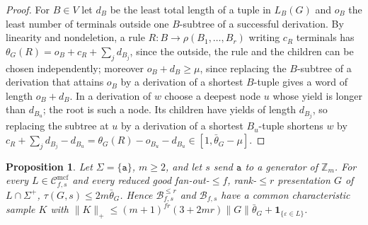 \documentclass[11pt]{article}
\numberwithin{equation}{section}
\theoremstyle{plain}
\newtheorem{proposition}[theorem]{Proposition}
\theoremstyle{definition}
\theoremstyle{remark}
\newcommand{\Cmcf}[2]{\mathcal{C}^{\mathrm{mcf}}_{#1,#2}}
\newcommand{\eps}{\varepsilon}
\begin{document}
\begin{proof}
For $B\in V$ let $d_B$ be the least total length of a tuple in $L_B(G)$ and $o_B$
the least number of terminals outside one $B$-subtree of a successful
derivation.  By linearity and nondeletion, a rule $R:B\to\rho(B_1,\ldots,B_r)$
writing $c_R$ terminals has $\theta_G(R)=o_B+c_R+\sum_jd_{B_j}$, since the outside,
the rule and the children can be chosen independently; moreover
$o_B+d_B\ge\mu$, since replacing the $B$-subtree of a derivation that attains $o_B$
by a derivation of a shortest $B$-tuple gives a word of length $o_B+d_B$.  In a derivation of $w$ choose a deepest node $u$ whose yield is
longer than $d_{B_u}$; the root is such a node.  Its children have yields of
length $d_{B_j}$, so replacing the subtree at $u$ by a derivation of a shortest
$B_u$-tuple shortens $w$ by
$c_R+\sum_jd_{B_j}-d_{B_u}=\theta_G(R)-o_{B_u}-d_{B_u}\in[1,\bar\theta_G-\mu]$.
\end{proof}

\begin{proposition}\label{prop:unary-cyclic-linear}
Let $\Sigma=\{\mathtt a\}$, $m\ge2$, and let $s$ send $\mathtt a$ to a generator of
$\mathbb Z_m$.  For every $L\in\Cmcf{f}{s}$ and every reduced good
fan-out-$\le f$, rank-$\le r$ presentation $G$ of $L\cap\Sigma^+$,
$\tau(G,s)\le2m\bar\theta_G$.  Hence $\mathcal B^{\le r}_{f,s}$ and
$\mathcal B_{f,s}$ have a common characteristic sample $K$ with
$\|K\|_+\le(m+1)^{fr}(3+2mr)\|G\|\bar\theta_G+\mathbf 1_{\{\eps\in L\}}$.
\end{proposition}
\end{document}
